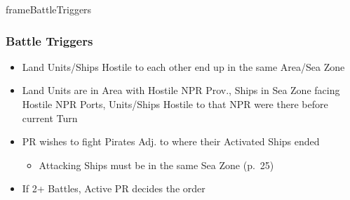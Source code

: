 \documentclass[10pt]{article}
\newlength{\fhBattleSequence} \setlength\fhBattleSequence{50\baselineskip}
\newlength{\fhBattleTriggers} \setlength\fhBattleTriggers{\calc{\textheight - \fhBattleSequence - \frameToFrameSpacing}}
\begin{document}
\begin{dynamiccontents*}{frameBattleTriggers}\begin{eubox}{\fhBattleTriggers}
	\begin{multicols}{2}
		\subsubsection*{Battle Triggers }
		\begin{itemize}
			\item Land Units/Ships Hostile to each other end up in the same Area/Sea Zone
			\item {}Land Units are in Area with Hostile NPR Prov.,  Ships in Sea Zone facing Hostile NPR Ports,  Units/Ships Hostile to that NPR were there before current Turn
			\item PR wishes to fight Pirates Adj. to where their Activated Ships ended 
			\begin{itemize}
				\item Attacking Ships must be in the same Sea Zone (p.~25)
			\end{itemize}
			\item If 2+ Battles, Active PR decides the order
		\end{itemize}
	\end{multicols}
\end{eubox}\end{dynamiccontents*}
\end{document}
